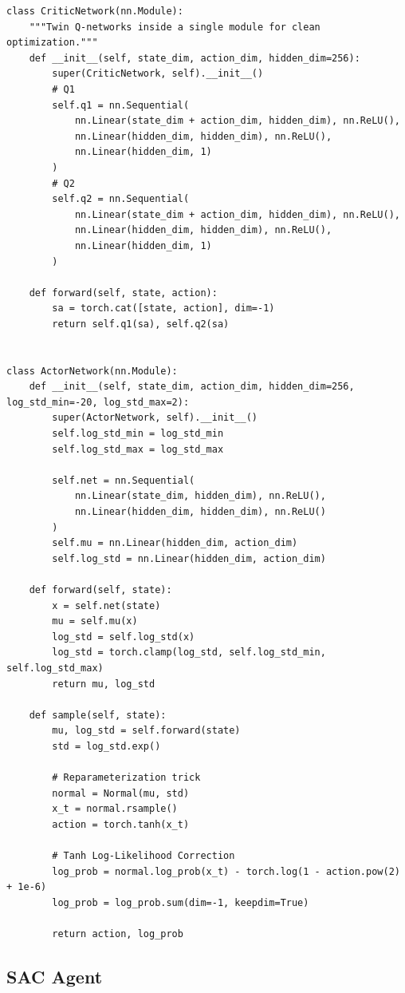 \documentclass[12pt,a4paper]{article}
\theoremstyle{noteplain}
\theoremstyle{noteexercise}
\begin{document}
\begin{lstlisting}[caption={Network Definitions}, label={lst:networks}]
class CriticNetwork(nn.Module):
    """Twin Q-networks inside a single module for clean optimization."""
    def __init__(self, state_dim, action_dim, hidden_dim=256):
        super(CriticNetwork, self).__init__()
        # Q1
        self.q1 = nn.Sequential(
            nn.Linear(state_dim + action_dim, hidden_dim), nn.ReLU(),
            nn.Linear(hidden_dim, hidden_dim), nn.ReLU(),
            nn.Linear(hidden_dim, 1)
        )
        # Q2
        self.q2 = nn.Sequential(
            nn.Linear(state_dim + action_dim, hidden_dim), nn.ReLU(),
            nn.Linear(hidden_dim, hidden_dim), nn.ReLU(),
            nn.Linear(hidden_dim, 1)
        )

    def forward(self, state, action):
        sa = torch.cat([state, action], dim=-1)
        return self.q1(sa), self.q2(sa)


class ActorNetwork(nn.Module):
    def __init__(self, state_dim, action_dim, hidden_dim=256, log_std_min=-20, log_std_max=2):
        super(ActorNetwork, self).__init__()
        self.log_std_min = log_std_min
        self.log_std_max = log_std_max
        
        self.net = nn.Sequential(
            nn.Linear(state_dim, hidden_dim), nn.ReLU(),
            nn.Linear(hidden_dim, hidden_dim), nn.ReLU()
        )
        self.mu = nn.Linear(hidden_dim, action_dim)
        self.log_std = nn.Linear(hidden_dim, action_dim)

    def forward(self, state):
        x = self.net(state)
        mu = self.mu(x)
        log_std = self.log_std(x)
        log_std = torch.clamp(log_std, self.log_std_min, self.log_std_max)
        return mu, log_std

    def sample(self, state):
        mu, log_std = self.forward(state)
        std = log_std.exp()
        
        # Reparameterization trick
        normal = Normal(mu, std)
        x_t = normal.rsample()
        action = torch.tanh(x_t)
        
        # Tanh Log-Likelihood Correction
        log_prob = normal.log_prob(x_t) - torch.log(1 - action.pow(2) + 1e-6)
        log_prob = log_prob.sum(dim=-1, keepdim=True)
        
        return action, log_prob
\end{lstlisting}



\subsection{SAC Agent}\label{ssec:sac-agent}
\end{document}
